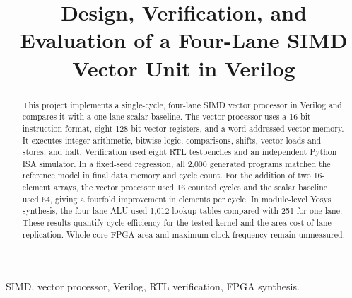 \documentclass[conference]{IEEEtran}
\begin{document}
\title{Design, Verification, and Evaluation of a Four-Lane SIMD Vector Unit in Verilog}

\author{
\and
{}
\and
{}
\and
{}
\and
{}
}


\maketitle

\begin{abstract}
This project implements a single-cycle, four-lane SIMD vector processor in
Verilog and compares it with a one-lane scalar baseline. The vector processor
uses a 16-bit instruction format, eight 128-bit vector registers, and a
word-addressed vector memory. It executes integer arithmetic, bitwise logic,
comparisons, shifts, vector loads and stores, and halt. Verification used
eight RTL testbenches and an independent Python ISA simulator. In a fixed-seed
regression, all 2,000 generated programs matched the reference model in final
data memory and cycle count. For the addition of two 16-element arrays, the
vector processor used 16 counted cycles and the scalar baseline used 64,
giving a fourfold improvement in elements per cycle. In module-level Yosys
synthesis, the four-lane ALU used 1,012 lookup tables compared with 251 for one
lane. These results quantify cycle efficiency for the tested kernel and the
area cost of lane replication. Whole-core FPGA area and maximum clock
frequency remain unmeasured.
\end{abstract}

\begin{IEEEkeywords}
SIMD, vector processor, Verilog, RTL verification, FPGA synthesis.
\end{IEEEkeywords}
\end{document}
